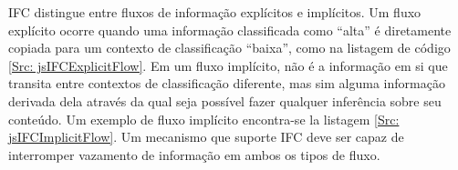 IFC distingue entre fluxos de informação explícitos e implícitos. Um fluxo explícito ocorre quando uma informação classificada como ``alta'' é diretamente copiada para um contexto de classificação ``baixa'', como na listagem de código \ref{Src: jsIFCExplicitFlow}. Em um fluxo implícito, não é a informação em si que transita entre contextos de classificação diferente, mas sim alguma informação derivada dela através da qual seja possível fazer qualquer inferência sobre seu conteúdo. Um exemplo de fluxo implícito encontra-se la listagem \ref{Src: jsIFCImplicitFlow}. Um mecanismo que suporte IFC deve ser capaz de interromper vazamento de informação em ambos os tipos de fluxo.



